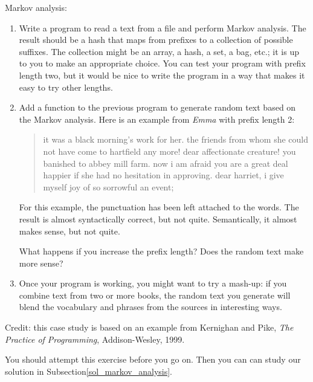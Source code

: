 \begin{exercise}

Markov analysis:
\label{markov_analysis}

\begin{enumerate}

\item Write a program to read a text from a file and perform Markov
analysis.  The result should be a hash that maps from
prefixes to a collection of possible suffixes.  The collection
might be an array, a hash, a set, a bag, etc.; it is up to you 
to make an appropriate choice.  You can test your program with 
prefix length two, but it would be nice to write the program 
in a way that makes it easy to try other lengths.

\item Add a function to the previous program to generate random text
based on the Markov analysis.  Here is an example from {\em Emma}
with prefix length 2:

\begin{quote}
it was a black morning's work for her. the friends from whom 
she could not have come to hartfield any more! dear affectionate 
creature! you banished to abbey mill farm. now i am afraid 
you are a great deal happier if she had no hesitation in 
approving. dear harriet, i give myself joy of so sorrowful an event;
\end{quote}

For this example, the punctuation has been left attached to 
the words. The result is almost syntactically correct, but not 
quite. Semantically, it almost makes sense, but not quite.

What happens if you increase the prefix length?  Does the random
text make more sense?

\item Once your program is working, you might want to try a mash-up:
if you combine text from two or more books, the random
text you generate will blend the vocabulary and phrases from
the sources in interesting ways.

\end{enumerate}

Credit: this case study is based on an example from Kernighan and
Pike, {\em The Practice of Programming}, Addison-Wesley, 1999.

\end{exercise}

You should attempt this exercise before you go on. Then you can can
study our solution in Subsection\ref{sol_markov_analysis}.


